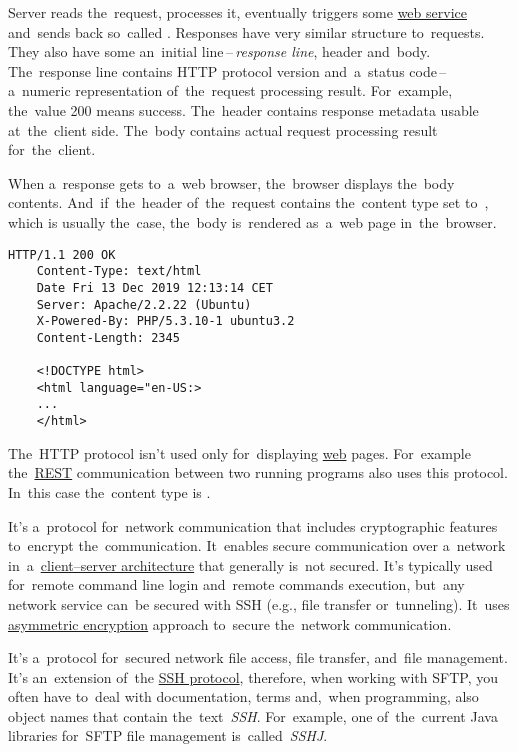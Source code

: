 Server reads the~request, processes it, eventually triggers some \hyperref[webserviceapplication]{web service} and~sends back so~called .
Responses have very similar structure to~requests.
They also have some an~initial line\,--\,\textit{response line}, header and~body.
The~response line contains HTTP protocol version and~a~status code\,--\, a~numeric representation of~the~request processing result.
For~example, the~value 200 means success.
The~header contains response metadata usable at~the~client side.
The~body contains actual request processing result for~the~client.

When a~response gets to~a~web browser, the~browser displays the~body contents.
And~if~the~header of~the~request contains the~content type set to~, which is usually the~case, the~body is~rendered as~a~web page in~the~browser.

\begin{lstlisting}[title={Example of a~HTTP response}]
    HTTP/1.1 200 OK
    Content-Type: text/html
    Date Fri 13 Dec 2019 12:13:14 CET
    Server: Apache/2.2.22 (Ubuntu)
    X-Powered-By: PHP/5.3.10-1 ubuntu3.2
    Content-Length: 2345

    <!DOCTYPE html>
    <html language="en-US:>
    ...
    </html>
\end{lstlisting}

\notenonl The~HTTP protocol isn't used only for~displaying \hyperref[internetweb]{web} pages.
For~example the~\hyperref[rest]{REST} communication between two running programs also uses this protocol.
In~this case the~content type is .

\label{https}

\label{smtp}

\label{ssh}
It's a~protocol for~network communication that includes cryptographic features to~encrypt the~communication.
It~enables secure communication over a~network in~a~\hyperref[clientserverarchitecture]{client--server architecture} that generally is~not secured.
It's typically used for~remote command line login and~remote commands execution, but~any network service can~be secured with SSH (e.g., file transfer or~tunneling).
It~uses \hyperref[asymmetricencryption]{asymmetric encryption} approach to~secure the~network communication.

\label{sftp}
It's a~protocol for~secured network file access, file transfer, and~file management.
It's an~extension of~the \hyperref[ssh]{SSH protocol}, therefore, when working with SFTP, you often have to~deal with documentation, terms and,~when programming, also object names that contain the~text~\textit{SSH}.
For~example, one of~the~current Java libraries for~SFTP file management is~called~\textit{SSHJ}.

